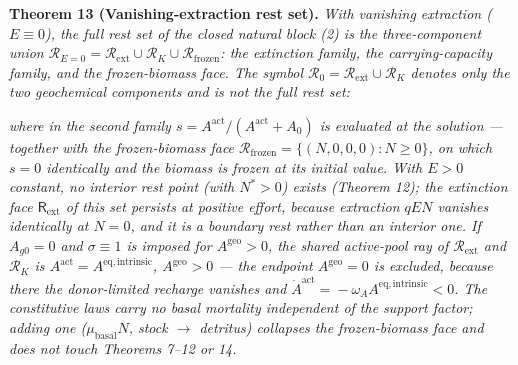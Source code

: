 \documentclass[11pt]{article}
\begin{document}
\textbf{Theorem 13 (Vanishing-extraction rest set).} \emph{With vanishing extraction (\(E \equiv 0\)), the full rest set of the closed natural block (2) is the three-component union \(\mathcal{R}_{E=0}=\mathcal{R}_{\mathrm{ext}}\cup\mathcal{R}_K\cup\mathcal{R}_{\mathrm{frozen}}\): the extinction family, the carrying-capacity family, and the frozen-biomass face. The symbol \(\mathcal{R}_0 = \mathcal{R}_{\mathrm{ext}} \cup \mathcal{R}_K\) denotes only the two geochemical components and is not the full rest set:}

\par\noindent{}\par

 \emph{where in the second family \(s =\allowbreak{} A^{\mathrm{act}}/(A^{\mathrm{act}} +\allowbreak{} A_0)\) is evaluated at the solution --- together with the frozen-biomass face \(\mathcal{R}_{\mathrm{frozen}} =\allowbreak{} \{(N,\allowbreak{} 0,\allowbreak{} 0,\allowbreak{} 0) : N \ge 0\}\), on which \(s = 0\) identically and the biomass is frozen at its initial value. With \(E>0\) constant, no interior rest point (with \(N^*>0\)) exists (Theorem 12); the extinction face \(\mathsf R_{\mathrm{ext}}\) of this set persists at positive effort, because extraction \(qEN\) vanishes identically at \(N=0\), and it is a boundary rest rather than an interior one. If \(A_{g0} = 0\) and \(\sigma \equiv 1\) is imposed for \(A^{\mathrm{geo}} > 0\), the shared active-pool ray of \(\mathcal{R}_{\mathrm{ext}}\) and \(\mathcal{R}_K\) is \(A^{\mathrm{act}} =\allowbreak{} A^{\mathrm{eq,\allowbreak{}intrinsic}}\), \(A^{\mathrm{geo}} > 0\) --- the endpoint \(A^{\mathrm{geo}} = 0\) is excluded, because there the donor-limited recharge vanishes and \(\dot A^{\mathrm{act}} =\allowbreak{} -\omega_A A^{\mathrm{eq,\allowbreak{}intrinsic}} < 0\). The constitutive laws carry no basal mortality independent of the support factor; adding one (\(\mu_{\mathrm{basal}} N\), stock \(\to\) detritus) collapses the frozen-biomass face and does not touch Theorems 7--12 or 14.}
\end{document}
